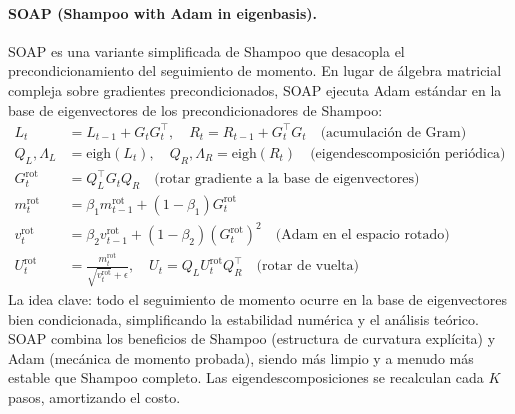 \documentclass[11pt,a4paper]{article}
\begin{document}
\paragraph{SOAP (Shampoo with Adam in eigenbasis).}
SOAP es una variante simplificada de Shampoo que desacopla el precondicionamiento del seguimiento de momento. En lugar de álgebra matricial compleja sobre gradientes precondicionados, SOAP ejecuta Adam estándar en la base de eigenvectores de los precondicionadores de Shampoo:
\begin{align}
L_t &= L_{t-1} + G_t G_t^\top, \quad R_t = R_{t-1} + G_t^\top G_t \quad\text{(acumulación de Gram)} \\
Q_L, \Lambda_L &= \text{eigh}(L_t), \quad Q_R, \Lambda_R = \text{eigh}(R_t) \quad\text{(eigendescomposición periódica)} \\
G_t^{\text{rot}} &= Q_L^\top G_t Q_R \quad\text{(rotar gradiente a la base de eigenvectores)} \\
m_t^{\text{rot}} &= \beta_1 m_{t-1}^{\text{rot}} + (1-\beta_1) G_t^{\text{rot}} \\
v_t^{\text{rot}} &= \beta_2 v_{t-1}^{\text{rot}} + (1-\beta_2)(G_t^{\text{rot}})^2 \quad\text{(Adam en el espacio rotado)} \\
U_t^{\text{rot}} &= \frac{m_t^{\text{rot}}}{\sqrt{v_t^{\text{rot}}}+\epsilon}, \quad U_t = Q_L U_t^{\text{rot}} Q_R^\top \quad\text{(rotar de vuelta)}
\end{align}
La idea clave: todo el seguimiento de momento ocurre en la base de eigenvectores bien condicionada, simplificando la estabilidad numérica y el análisis teórico. SOAP combina los beneficios de Shampoo (estructura de curvatura explícita) y Adam (mecánica de momento probada), siendo más limpio y a menudo más estable que Shampoo completo. Las eigendescomposiciones se recalculan cada $K$ pasos, amortizando el costo.
\end{document}
